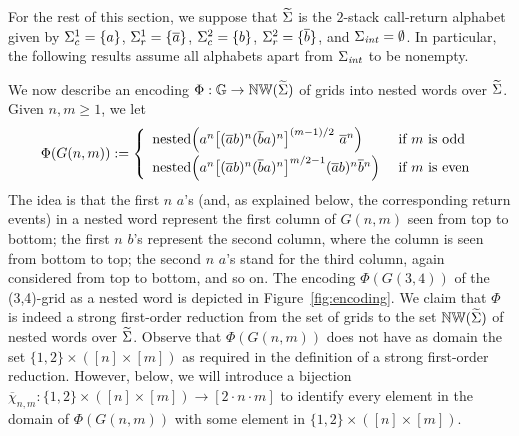 \documentclass{LMCS}
\begin{document}
For the rest of this section, we suppose that $\widetilde{\Sigma}$ is the $2$-stack
call-return alphabet given by $\Sigma_c^1=\{a\}$, $\Sigma_r^1=\{\overline{a}\}$,
$\Sigma_c^2=\{b\}$, $\Sigma_r^2=\{\overline{b}\}$, and $\Sigma_{\mathit{int}} = \emptyset$.
In particular, the following results assume all alphabets apart from
$\Sigma_{\mathit{int}}$ to be nonempty.

\newcommand{\pos}{\mathit{pos}}
\newcommand{\nodemap}{\chi_{n,m}}
\newcommand{\fullmap}{\overline{\chi}_{n,m}}

We now describe an encoding $\Phi: \mathbb{G} \rightarrow \mathbb{NW}(\widetilde{\Sigma})$ of grids
into nested words over $\widetilde{\Sigma}$. Given $n,m \ge 1$, we let
\[\Phi(G(n,m)) := \left\{
 \begin{array}{ll}
   \nested\Bigl(a^n \bigl[(\overline{a} b)^n (\overline{b}
   a)^n\bigr]^{(m-1)/2~}\overline{a}^n\Bigr) & \text{~if~}  m
   \text{~is~odd}\vspace{0.5ex}\\
   \nested\Bigl(a^n \bigl[(\overline{a} b)^n (\overline{b} a)^n\bigr]^{m/2-1}
   (\overline{a} b)^n \overline{b}~\!\!^n\Bigr)  & \text{~if~}  m \text{~is~even}
 \end{array}
\right.
\]
The idea is that the first $n$ $a$'s (and, as explained below, the
corresponding return events) in a nested word represent the first column of
$G(n,m)$ seen from top to bottom; the first $n$ $b$'s represent the second
column, where the column is seen from bottom to top; the second $n$ $a$'s
stand for the third column, again considered from top to bottom, and so on.
The encoding $\Phi(G(3,4))$ of the (3,4)-grid as a nested word is depicted in
Figure~\ref{fig:encoding}. We claim that $\Phi$ is indeed a strong first-order
reduction from the set of grids to the set $\mathbb{NW}(\widetilde{\Sigma})$ of nested words
over $\widetilde{\Sigma}$. Observe that $\Phi(G(n,m))$ does not have as domain the set
$\{1,2\} \times ([n] \times [m])$ as required in the definition of a strong
first-order reduction. However, below, we will introduce a bijection
$\fullmap: \{1,2\} \times ([n] \times [m]) \rightarrow [2 \cdot n \cdot m]$ to
identify every element in the domain of $\Phi(G(n,m))$ with some element in
$\{1,2\} \times ([n] \times [m])$.
\end{document}
